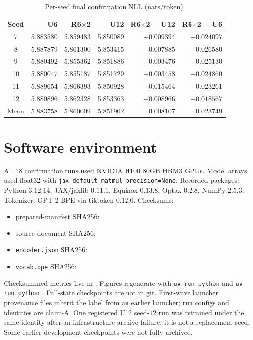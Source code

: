 \documentclass{article}
\begin{document}
\begin{table}[h]
\centering
\caption{Per-seed final confirmation NLL (nats/token).}
\label{tab:per-seed-nll}
\begin{tabular}{crrrrr}
\toprule
Seed & U6 & R6$\times$2 & U12 & R6$\times$2 $-$ U12 & R6$\times$2 $-$ U6 \\
\midrule
7  & 5.883580 & 5.859483 & 5.850089 & $+0.009394$ & $-0.024097$ \\
8  & 5.887879 & 5.861300 & 5.853415 & $+0.007885$ & $-0.026580$ \\
9  & 5.880492 & 5.855362 & 5.851886 & $+0.003476$ & $-0.025130$ \\
10 & 5.880047 & 5.855187 & 5.851729 & $+0.003458$ & $-0.024860$ \\
11 & 5.889654 & 5.866393 & 5.850928 & $+0.015464$ & $-0.023261$ \\
12 & 5.880896 & 5.862328 & 5.853363 & $+0.008966$ & $-0.018567$ \\
\midrule
Mean & 5.883758 & 5.860009 & 5.851902 & $+0.008107$ & $-0.023749$ \\
\bottomrule
\end{tabular}
\end{table}

\section{Software environment}
\label{app:env}

All $18$ confirmation runs used NVIDIA H100 80GB HBM3 GPUs. Model arrays used float32 with \texttt{jax\_default\_matmul\_precision=None}. Recorded packages: Python $3.12.14$, JAX/jaxlib $0.11.1$, Equinox $0.13.8$, Optax $0.2.8$, NumPy $2.5.3$. Tokenizer: GPT-2 BPE via tiktoken $0.12.0$. Checksums:
\begin{itemize}
  \setlength{\itemsep}{0.25em}
  \item prepared-manifest SHA256: 
  \item source-document SHA256: 
  \item \texttt{encoder.json} SHA256: 
  \item \texttt{vocab.bpe} SHA256: 
\end{itemize}

Checksummed metrics live in . Figures regenerate with \texttt{uv run python}  and \texttt{uv run python} . Full-state checkpoints are not in git. First-wave launcher provenance files inherit the label  from an earlier launcher; run configs and identities are claim-A. One registered U12 seed-$12$ run was retrained under the same identity after an infrastructure archive failure; it is not a replacement seed. Some earlier development checkpoints were not fully archived.
\end{document}
